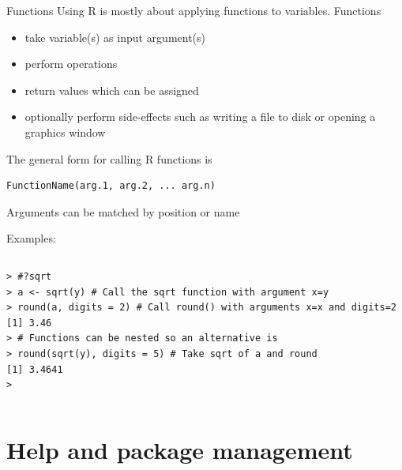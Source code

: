 \documentclass[table,smaller]{beamer}
\begin{document}
\begin{frame}[fragile,label=sec-3-2]{Functions}
 Using R is mostly about applying \alert{functions} to \alert{variables}. Functions
\begin{itemize}
\item take \alert{variable(s)} as input \alert{argument(s)}
\item perform operations
\item \alert{return} values which can be \alert{assigned}
\item optionally perform side-effects such as writing a file to disk or opening a graphics window
\end{itemize}

The general form for calling R functions is 
\begin{verbatim}
FunctionName(arg.1, arg.2, ... arg.n)
\end{verbatim}

Arguments can be matched by position or name

Examples:
\vspace{-.5em}
\begin{columns}
\begin{block}{}
\begin{verbatim}
> #?sqrt
> a <- sqrt(y) # Call the sqrt function with argument x=y
> round(a, digits = 2) # Call round() with arguments x=x and digits=2
[1] 3.46
> # Functions can be nested so an alternative is
> round(sqrt(y), digits = 5) # Take sqrt of a and round
[1] 3.4641
>
\end{verbatim}
\end{block}
\end{columns}
\vspace{.5em}
\end{frame}


\section{Help and package management}
\label{sec-4}
\end{document}
